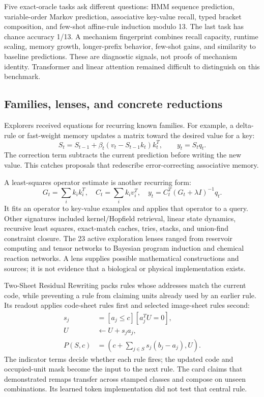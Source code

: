 Five exact-oracle tasks ask different questions: HMM sequence prediction, variable-order Markov prediction, associative key-value recall, typed bracket composition, and few-shot affine-rule induction modulo 13. The last task has chance accuracy 1/13. A mechanism fingerprint combines recall capacity, runtime scaling, memory growth, longer-prefix behavior, few-shot gains, and similarity to baseline predictions. These are diagnostic signals, not proofs of mechanism identity. Transformer and linear attention remained difficult to distinguish on this benchmark.

\subsection{Families, lenses, and concrete reductions}

Explorers received equations for recurring known families. For example, a delta-rule or fast-weight memory updates a matrix toward the desired value for a key:
\begin{equation}
S_t=S_{t-1}+\beta_t(v_t-S_{t-1}k_t)k_t^T,\qquad y_t=S_tq_t.
\end{equation}
The correction term subtracts the current prediction before writing the new value. This catches proposals that redescribe error-correcting associative memory.

A least-squares operator estimate is another recurring form:
\begin{equation}
G_t=\sum_i k_ik_i^T,\quad C_t=\sum_i k_iv_i^T,\quad y_t=C_t^T(G_t+\lambda I)^{-1}q_t.
\end{equation}
It fits an operator to key-value examples and applies that operator to a query. Other signatures included kernel/Hopfield retrieval, linear state dynamics, recursive least squares, exact-match caches, tries, stacks, and union-find constraint closure. The 23 active exploration lenses ranged from reservoir computing and tensor networks to Bayesian program induction and chemical reaction networks. A lens supplies possible mathematical constructions and sources; it is not evidence that a biological or physical implementation exists.

Two-Sheet Residual Rewriting packs rules whose addresses match the current code, while preventing a rule from claiming units already used by an earlier rule. Its readout applies code-sheet rules first and selected image-sheet rules second:
\begin{equation}
\begin{aligned}
s_j&=[a_j\le c][a_j^TU=0],\\
U&\leftarrow U+s_ja_j,\\
P(S,c)&=\left(c+\sum_{j\in S}s_j(b_j-a_j),U\right).
\end{aligned}
\end{equation}
The indicator terms decide whether each rule fires; the updated code and occupied-unit mask become the input to the next rule. The card claims that demonstrated remaps transfer across stamped classes and compose on unseen combinations. Its learned token implementation did not test that central rule.

